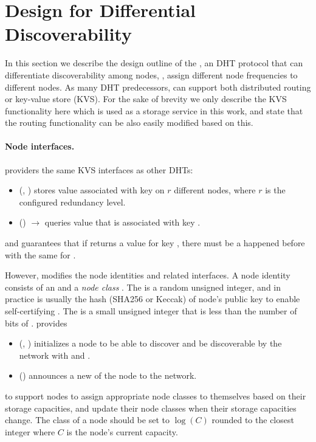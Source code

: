 \section{Design for Differential Discoverability}
\label{sec:dht}

In this section we describe the design outline of the \dht, an DHT protocol that can differentiate discoverability among nodes, \ie, assign different node frequencies to different nodes.
As many DHT predecessors, \dht can support both distributed routing or key-value store (KVS).
For the sake of brevity we only describe the KVS functionality here which is used as a storage service in this work, and state that the routing functionality can be also easily modified based on this.

\paragraph{Node interfaces.}
\dht providers the same KVS interfaces as other DHTs:
\begin{itemize}
    \item \fput(, ) stores value  associated with key  on $r$ different nodes, where $r$ is the configured redundancy level.
    \item \fget() $\to$  queries value that is associated with key .
\end{itemize}
\noindent and guarantees that if \fget returns a value  for key , there must be a \fput happened before with the same  for .

However, \dht modifies the node identities and related interfaces.
A node identity consists of an \vid and a \emph{node class} \vclass.
The \vid is a random unsigned integer, and in practice \vid is usually the hash (\eg SHA256 or Keccak) of node's public key to enable self-certifying \vid.
The \vclass is a small unsigned integer that is less than the number of bits of \vid.
\dht provides
\begin{itemize}
    \item \fboot(\vid, \vclass) initializes a node to be able to discover and be discoverable by the network with \vid and \vclass.
    \item \fupdate(\vclass) announces a new \vclass of the node to the network.
\end{itemize}
\noindent to support nodes to assign appropriate node classes to themselves based on their storage capacities, and update their node classes when their storage capacities change.
The class of a node should be set to $\log(C)$ rounded to the closest integer where $C$ is the node's current capacity.

